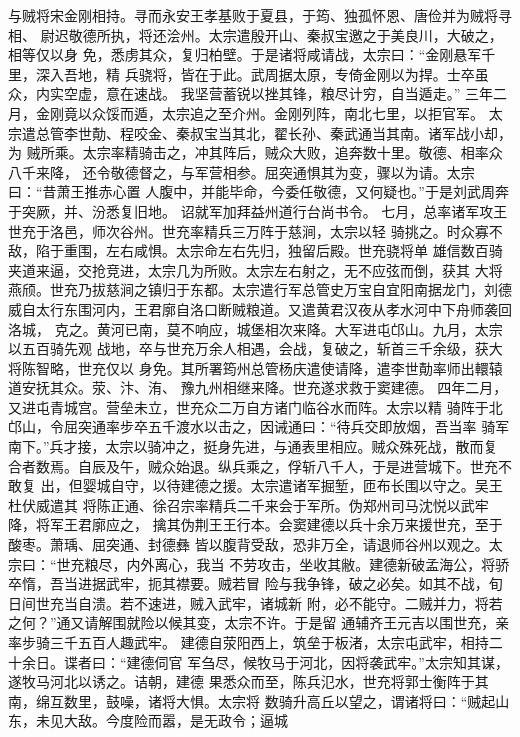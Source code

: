 \documentclass[12pt,UTF8]{ctexbook}
\begin{document}
与贼将宋金刚相持。寻而永安王孝基败于夏县，于筠、独孤怀恩、唐俭并为贼将寻相、
尉迟敬德所执，将还浍州。太宗遣殷开山、秦叔宝邀之于美良川，大破之，相等仅以身
免，悉虏其众，复归柏壁。于是诸将咸请战，太宗曰：“金刚悬军千里，深入吾地，精
兵骁将，皆在于此。武周据太原，专倚金刚以为捍。士卒虽众，内实空虚，意在速战。
我坚营蓄锐以挫其锋，粮尽计穷，自当遁走。”
三年二月，金刚竟以众馁而遁，太宗追之至介州。金刚列阵，南北七里，以拒官军。
太宗遣总管李世勣、程咬金、秦叔宝当其北，翟长孙、秦武通当其南。诸军战小却，为
贼所乘。太宗率精骑击之，冲其阵后，贼众大败，追奔数十里。敬德、相率众八千来降，
还令敬德督之，与军营相参。屈突通惧其为变，骤以为请。太宗曰：“昔萧王推赤心置
人腹中，并能毕命，今委任敬德，又何疑也。”于是刘武周奔于突厥，并、汾悉复旧地。
诏就军加拜益州道行台尚书令。
七月，总率诸军攻王世充于洛邑，师次谷州。世充率精兵三万阵于慈涧，太宗以轻
骑挑之。时众寡不敌，陷于重围，左右咸惧。太宗命左右先归，独留后殿。世充骁将单
雄信数百骑夹道来逼，交抢竞进，太宗几为所败。太宗左右射之，无不应弦而倒，获其
大将燕颀。世充乃拔慈涧之镇归于东都。太宗遣行军总管史万宝自宜阳南据龙门，刘德
威自太行东围河内，王君廓自洛口断贼粮道。又遣黄君汉夜从孝水河中下舟师袭回洛城，
克之。黄河已南，莫不响应，城堡相次来降。大军进屯邙山。九月，太宗以五百骑先观
战地，卒与世充万余人相遇，会战，复破之，斩首三千余级，获大将陈智略，世充仅以
身免。其所署筠州总管杨庆遣使请降，遣李世勣率师出轘辕道安抚其众。荥、汴、洧、
豫九州相继来降。世充遂求救于窦建德。
四年二月，又进屯青城宫。营垒未立，世充众二万自方诸门临谷水而阵。太宗以精
骑阵于北邙山，令屈突通率步卒五千渡水以击之，因诫通曰：“待兵交即放烟，吾当率
骑军南下。”兵才接，太宗以骑冲之，挺身先进，与通表里相应。贼众殊死战，散而复
合者数焉。自辰及午，贼众始退。纵兵乘之，俘斩八千人，于是进营城下。世充不敢复
出，但婴城自守，以待建德之援。太宗遣诸军掘堑，匝布长围以守之。吴王杜伏威遣其
将陈正通、徐召宗率精兵二千来会于军所。伪郑州司马沈悦以武牢降，将军王君廓应之，
擒其伪荆王王行本。会窦建德以兵十余万来援世充，至于酸枣。萧瑀、屈突通、封德彝
皆以腹背受敌，恐非万全，请退师谷州以观之。太宗曰：“世充粮尽，内外离心，我当
不劳攻击，坐收其敝。建德新破孟海公，将骄卒惰，吾当进据武牢，扼其襟要。贼若冒
险与我争锋，破之必矣。如其不战，旬日间世充当自溃。若不速进，贼入武牢，诸城新
附，必不能守。二贼并力，将若之何？”通又请解围就险以候其变，太宗不许。于是留
通辅齐王元吉以围世充，亲率步骑三千五百人趣武牢。
建德自荥阳西上，筑垒于板渚，太宗屯武牢，相持二十余日。谍者曰：“建德伺官
军刍尽，候牧马于河北，因将袭武牢。”太宗知其谋，遂牧马河北以诱之。诘朝，建德
果悉众而至，陈兵氾水，世充将郭士衡阵于其南，绵互数里，鼓噪，诸将大惧。太宗将
数骑升高丘以望之，谓诸将曰：“贼起山东，未见大敌。今度险而嚣，是无政令；逼城
\end{document}
